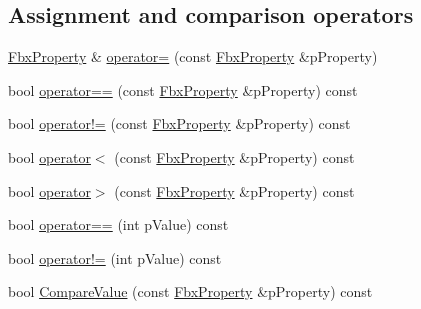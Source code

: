 \subsection*{Assignment and comparison operators}
\begin{DoxyCompactItemize}
\item 
\hyperlink{class_fbx_property}{Fbx\+Property} \& \hyperlink{class_fbx_property_a14126bd5d02fd8558c5946cc7ba12d46}{operator=} (const \hyperlink{class_fbx_property}{Fbx\+Property} \&p\+Property)
\item 
bool \hyperlink{class_fbx_property_a5c68be7d9ec048949e5f0b489e1f687c}{operator==} (const \hyperlink{class_fbx_property}{Fbx\+Property} \&p\+Property) const
\item 
bool \hyperlink{class_fbx_property_a78e06f51d52af04ffef695e3dd795659}{operator!=} (const \hyperlink{class_fbx_property}{Fbx\+Property} \&p\+Property) const
\item 
bool \hyperlink{class_fbx_property_aa02dd8d143c2814367c1a81de6ab42a2}{operator$<$} (const \hyperlink{class_fbx_property}{Fbx\+Property} \&p\+Property) const
\item 
bool \hyperlink{class_fbx_property_a78307c874fd49f1721713da94d953423}{operator$>$} (const \hyperlink{class_fbx_property}{Fbx\+Property} \&p\+Property) const
\item 
bool \hyperlink{class_fbx_property_a027c88dfbe6dc8283307ec81edf79159}{operator==} (int p\+Value) const
\item 
bool \hyperlink{class_fbx_property_a9cb24dd197f19e6d1cc8dad2b757dce0}{operator!=} (int p\+Value) const
\item 
bool \hyperlink{class_fbx_property_a41408b250f8d1f15baa0aa358a7cc163}{Compare\+Value} (const \hyperlink{class_fbx_property}{Fbx\+Property} \&p\+Property) const
\end{DoxyCompactItemize}
